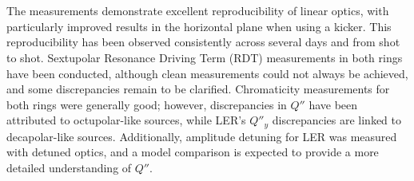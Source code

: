 \FloatBarrier
\section{}

The measurements demonstrate excellent reproducibility of linear optics, with particularly improved
results in the horizontal plane when using a kicker. This reproducibility has been observed
consistently across several days and from shot to shot. Sextupolar Resonance Driving Term (RDT)
measurements in both rings have been conducted, although clean measurements could not always be
achieved, and some discrepancies remain to be clarified. Chromaticity measurements for both rings
were generally good; however, discrepancies in \( Q'' \) have been attributed to octupolar-like
sources, while LER's \( Q''_y \) discrepancies are linked to decapolar-like sources. Additionally,
amplitude detuning for LER was measured with detuned optics, and a model comparison is expected to
provide a more detailed understanding of \( Q'' \).